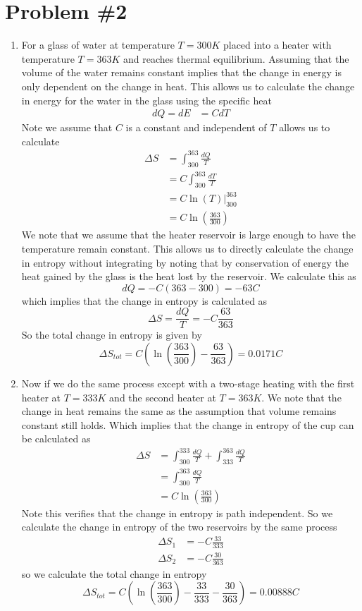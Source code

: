\documentclass[11pt]{article}
\numberwithin{equation}{section}
\begin{document}
\section{Problem \#2}
\begin{enumerate}[(1)]
\item For a glass of water at temperature $T=300\unit{K}$ placed into a heater with 
temperature $T=363\unit{K}$ and reaches thermal equilibrium. Assuming that the volume of the
water remains constant implies that the change in energy is only dependent on the change in 
heat. This allows us to calculate the change in energy for the water in the glass using the
specific heat
\begin{align*}
dQ = dE &= CdT
\end{align*}
Note we assume that $C$ is a constant and independent of $T$ allows us to calculate
\begin{align*}
\Delta{S} &= \int_{300}^{363}\frac{dQ}{T}\\
&= C\int_{300}^{363}\frac{dT}{T}\\
&= \left.C\ln(T)\right|_{300}^{363}\\
&= C\ln\left(\frac{363}{300}\right)
\end{align*}
We note that we assume that the heater reservoir is large enough to have the temperature 
remain constant. This allows us to directly calculate the change in entropy without integrating
by noting that by conservation of energy the heat gained by the glass is the heat lost by the
reservoir. We calculate this as
$$dQ = -C(363-300) = -63C$$
which implies that the change in entropy is calculated as
$$\Delta{S} = \frac{dQ}{T} = -C\frac{63}{363}$$
So the total change in entropy is given by
$$\Delta{S_{tot}} = C\left(\ln\left(\frac{363}{300}\right)-\frac{63}{363}\right) = 0.0171C$$

\item Now if we do the same process except with a two-stage heating with the first heater at
$T=333\unit{K}$ and the second heater at $T= 363\unit{K}$. We note that the change in heat 
remains the same as the assumption that volume remains constant still holds. Which implies 
that the change in entropy of the cup can be calculated as
\begin{align*}
\Delta{S} &= \int_{300}^{333}\frac{dQ}{T} + \int_{333}^{363}\frac{dQ}{T}\\
&= \int_{300}^{363}\frac{dQ}{T}\\
&= C\ln\left(\frac{363}{300}\right)
\end{align*}
Note this verifies that the change in entropy is path independent. So we calculate the change
in entropy of the two reservoirs by the same process
\begin{align*}
\Delta{S_1} &= -C\frac{33}{333}\\
\Delta{S_2} &= -C\frac{30}{363}
\end{align*}
so we calculate the total change in entropy 
$$\Delta{S_{tot}} = C\left(\ln\left(\frac{363}{300}\right)-\frac{33}{333}-\frac{30}{363}\right) = 0.00888C$$


\end{enumerate}
\end{document}
